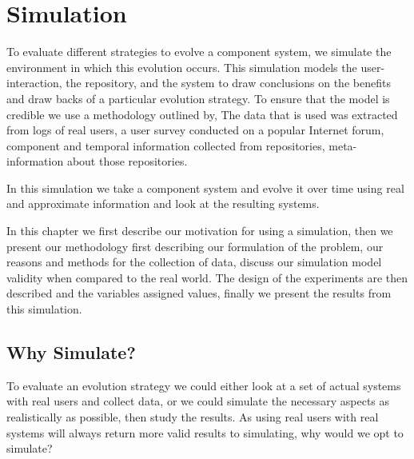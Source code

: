 \chapter{Simulation}
{}To evaluate different strategies to evolve a component system, we simulate the environment in which this evolution occurs.
{}This simulation models the user-interaction, the repository, and the system
{}to draw conclusions on the benefits and draw backs of a particular evolution strategy.
{}To ensure that the model is credible we use a methodology outlined by, %
{}The data that is used was extracted from logs of real users, a user survey conducted on a popular Internet forum, 
{}component and temporal information collected from repositories, meta-information about those repositories.

{}In this simulation we take a component system and evolve it over time using real and approximate information and look at the resulting systems.

{}In this chapter we first describe our motivation for using a simulation,
{}then we present our methodology
{}first describing our formulation of the problem,
{}our reasons and methods for the collection of data,
{}discuss our simulation model validity when compared to the real world.
{}The design of the experiments are then described and the variables assigned values,
{}finally we present the results from this simulation.
 
\section{Why Simulate?}
To evaluate an evolution strategy we could either look at a set of actual systems with real users and collect data,
or we could simulate the necessary aspects as realistically as possible, then study the results.
As using real users with real systems will always return more valid results to simulating,
why would we opt to simulate?

